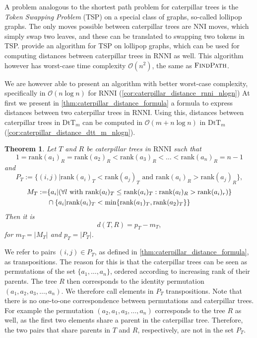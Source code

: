 \documentclass[11pt]{amsart}
\newtheorem{theorem}{Theorem}
\newcommand{\rnni}{\mathrm{RNNI}}
\newcommand{\findpath}{\textsc{FindPath}}
\newcommand{\rank}{\mathrm{rank}}
\newcommand{\nni}{\mathrm{NNI}}
\newcommand{\dtt}{\mathrm{DtT}}
\renewcommand{\O}{\mathcal O}
\begin{document}
A problem analogous to the shortest path problem for caterpillar trees is the \emph{Token Swapping Problem} (TSP) \autocite{Kawahara2017-ey} on a special class of graphs, so-called lollipop graphs.
The only moves possible between caterpillar trees are $\nni$ moves, which simply swap two leaves, and these can be translated to swapping two tokens in TSP.
\textcite{Kawahara2017-ey} provide an algorithm for TSP on lollipop graphs, which can be used for computing distances between caterpillar trees in $\rnni$ as well.
This algorithm however has worst-case time complexity $\O(n^2)$, the same as $\findpath$.

We are however able to present an algorithm with better worst-case complexity, specifically in $\O(n \log n)$ for $\rnni$ (\autoref{cor:caterpillar_distance_rnni_nlogn})
At first we present in \autoref{thm:caterpillar_distance_formula} a formula to express distances between two caterpillar trees in $\rnni$.
Using this, distances between caterpillar trees in $\dtt_m$ can be computed in $\O(m + n \log n)$ in $\dtt_m$ (\autoref{cor:caterpillar_distance_dtt_m_nlogn}).

\begin{theorem}
	Let $T$ and $R$ be caterpillar trees in $\rnni$ such that \[1 = \rank(a_1)_R = \rank(a_2)_R < \rank(a_3)_R < \ldots < \rank(a_n)_R = n-1\]
	and
	\[P_T := \{(i,j)| \rank(a_i)_T < \rank(a_j)_T \text{ and } \rank(a_i)_R > \rank(a_j)_R\},\]
	\begin{align*}
		M_T := &\{a_i| (\forall l \textnormal{ with } \rank(a_l)_T \leq \rank(a_i)_T: \rank(a_l)_R > \rank(a_i)_r)\} \\
		& \cap \{a_i | \rank(a_i)_T < \min\{\rank(a_1)_T, \rank(a_2)_T\}\}
	\end{align*}
	Then it is
	\[d(T,R) = p_T - m_T,\]
	for ${m_T = |M_T|}$ and ${p_T = |P_T|}$.
	\label{thm:caterpillar_distance_formula}
\end{theorem}

We refer to pairs $(i,j) \in P_T$, as defined in \autoref{thm:caterpillar_distance_formula}, as transpositions.
The reason for this is that the caterpillar trees can be seen as permutations of the set $\{a_1, \ldots, a_n\}$, ordered according to increasing rank of their parents.
The tree $R$ then corresponds to the identity permutation $(a_1, a_2, a_3, \ldots, a_n)$.
We therefore call elements in $P_T$ transpositions.
Note that there is no one-to-one correspondence between permutations and caterpillar trees.
For example the permutation $(a_2, a_1, a_3, \ldots, a_n)$ corresponds to the tree $R$ as well, as the first two elements share a parent in the caterpillar tree.
Therefore, the two pairs that share parents in $T$ and $R$, respectively, are not in the set $P_T$.
\end{document}
